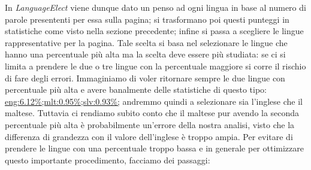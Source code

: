 \documentclass{article}
\newcommand{\class}[1]{\textit{#1}}
\newcommand{\mintedstyle}[1]{\url{#1}}
\begin{document}
In \class{LanguageElect} viene dunque dato un penso ad ogni lingua in base al numero di parole presententi per essa sulla pagina; si trasformano poi questi punteggi in statistiche come visto nella sezione precedente; infine si passa a scegliere le lingue rappresentative per la pagina.
Tale scelta si basa nel selezionare le lingue che hanno una percentuale più alta ma la scelta deve essere più studiata: se ci si limita a prendere le due o tre lingue con la percentuale maggiore si corre il rischio di fare degli errori. Immaginiamo di voler ritornare sempre le due lingue con percentuale più alta e avere banalmente delle statistiche di questo tipo: \mintedstyle{eng:6.12\%;mlt:0.95\%;slv:0.93\%;} andremmo quindi a selezionare sia l'inglese che il maltese. Tuttavia ci rendiamo subito conto che il maltese pur avendo la seconda percentuale più alta è probabilmente un'errore della nostra analisi, visto che la differenza di grandezza con il valore dell'inglese è troppo ampia. Per evitare di prendere le lingue con una percentuale troppo bassa e in generale per ottimizzare questo importante procedimento, facciamo dei passaggi: 
\end{document}
